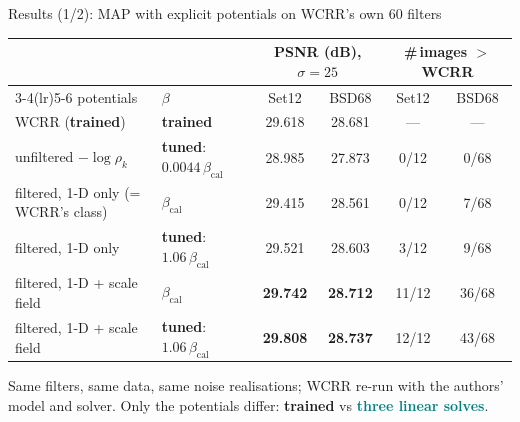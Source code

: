 \documentclass[10pt,aspectratio=169]{beamer}
\newcommand{\EXP}[1]{\textcolor{teal}{\textbf{#1}}}
\newcommand{\TRN}[1]{\textcolor{wine}{\textbf{#1}}}
\newcommand{\HLD}[1]{\textcolor{amber}{\textbf{#1}}}
\newcommand{\bcal}{\beta_{\mathrm{cal}}}
\newcommand{\WSt}{29.618}\newcommand{\WBs}{28.681}           %
\begin{document}
\begin{frame}{Results (1/2): MAP with explicit potentials on WCRR's own 60 filters}
\centering
\footnotesize
\renewcommand{\arraystretch}{1.2}
\begin{tabular}{@{}llcccc@{}}
\toprule
 & & \multicolumn{2}{c}{PSNR (dB), $\sigma=25$} & \multicolumn{2}{c}{\#\,images $>$ WCRR}\\
\cmidrule(lr){3-4}\cmidrule(lr){5-6}
potentials & $\beta$ & Set12 & BSD68 & Set12 & BSD68\\\midrule
WCRR (\TRN{trained}) & \TRN{trained} & \WSt & \WBs & --- & ---\\\midrule
unfiltered $-\log\rho_k$ & \HLD{tuned}: $0.0044\,\bcal$ & 28.985 & 27.873 & 0/12 & 0/68\\
filtered, 1-D only (= WCRR's class) & $\bcal$ & 29.415 & 28.561 & 0/12 & 7/68\\
filtered, 1-D only & \HLD{tuned}: $1.06\,\bcal$ & 29.521 & 28.603 & 3/12 & 9/68\\
filtered, 1-D + scale field & $\bcal$ & \textbf{29.742} & \textbf{28.712} & 11/12 & 36/68\\
filtered, 1-D + scale field & \HLD{tuned}: $1.06\,\bcal$ & \textbf{29.808} & \textbf{28.737} & 12/12 & 43/68\\
\bottomrule
\end{tabular}

\medskip
\begin{keybox}
\small Same filters, same data, same noise realisations; WCRR re-run with the authors' model and
solver. Only the potentials differ: \TRN{trained} vs \EXP{three linear solves}.
\end{keybox}
\end{frame}
\end{document}
